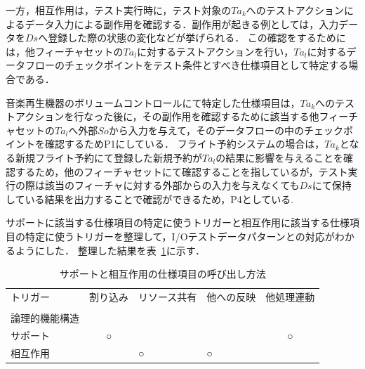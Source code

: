 一方，相互作用は，テスト実行時に，テスト対象の$Ta_k$へのテストアクションによるデータ入力による副作用を確認する．副作用が起きる例としては，入力データを$Ds$へ登録した際の状態の変化などが挙げられる．
この確認をするためには，他フィーチャセットの$Ta_l$に対するテストアクションを行い，$Ta_l$に対するデータフローのチェックポイントをテスト条件とすべき仕様項目として特定する場合である．

音楽再生機器のボリュームコントロールにて特定した仕様項目は，$Ta_k$へのテストアクションを行なった後に，その副作用を確認するために該当する他フィーチャセットの$Ta_l$へ外部$So$から入力を与えて，そのデータフローの中のチェックポイントを確認するためP1にしている．
フライト予約システムの場合は，$Ta_k$となる新規フライト予約にて登録した新規予約が$Ta_l$の結果に影響を与えることを確認するため，他のフィーチャセットにて確認することを指しているが，テスト実行の際は該当のフィーチャに対する外部からの入力を与えなくても$Ds$にて保持している結果を出力することで確認ができるため，P4としている.

サポートに該当する仕様項目の特定に使うトリガーと相互作用に該当する仕様項目の特定に使うトリガーを整理して，I/Oテストデータパターンとの対応がわかるようにした．
整理した結果を表~\ref{tab:D-4SandI2}に示す．
\begin{table}[htbp]
  \centering
  \caption{サポートと相互作用の仕様項目の呼び出し方法}
    \begin{tabular}{|p{5em}|c|p{4em}|p{5em}|c|}
    \hline
    トリガー  & \multicolumn{1}{p{4em}|}{割り込み} & リソース共有 & 他への反映 & \multicolumn{1}{p{5em}|}{他処理連動} \bigstrut[t]\\
    \multicolumn{1}{|l|}{} &       & \multicolumn{1}{r|}{} & \multicolumn{1}{r|}{} &  \\
    論理的機能構造 &       & \multicolumn{1}{r|}{} & \multicolumn{1}{r|}{} &  \bigstrut[b]\\
    \hline
    \hline
    サポート  & \multicolumn{1}{p{4em}|}{○} & \multicolumn{1}{c|}{} & \multicolumn{1}{c|}{} & \multicolumn{1}{p{4em}|}{○} \bigstrut\\
    \hline
    相互作用  &       & ○     & ○     &  \bigstrut\\
    \hline
    \end{tabular}%
  \label{tab:D-4SandI2}%
\end{table}%


